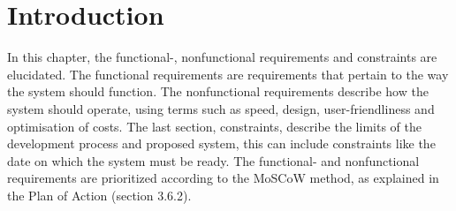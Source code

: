 \section{Introduction}
In this chapter, the functional-, nonfunctional requirements and constraints are elucidated. The functional requirements are requirements that pertain to the way the system should function. The nonfunctional requirements describe how the system should operate, using terms such as speed, design, user-friendliness and optimisation of costs. The last section, constraints, describe the limits of the development process and proposed system, this can include constraints like the date on which the system must be ready. The functional- and nonfunctional requirements are prioritized according to the MoSCoW method, as explained in the Plan of Action (section 3.6.2).
